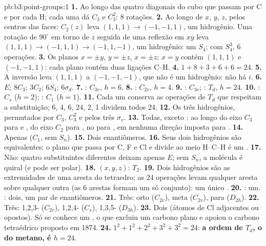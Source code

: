 \begin{solution}{pb:b3:point-groups:1}
\textbf{1.} Ao longo das quatro diagonais do cubo que passam por C e por cada H;
cada uma dá $C_3$ e $C_3^2$: 8 rotações.
\textbf{2.} Ao longo de $x$, $y$, $z$, pelos centros das faces: $C_2(z)$ leva $(1,1,1)
\to (-1,-1,1)$, um hidrogênio. Uma rotação de $90^\circ$ em torno de $z$ seguida
de uma reflexão em $xy$ leva $(1,1,1) \to (-1,1,1) \to (-1,1,-1)$, um hidrogênio: um
$S_4$; com $S_4^3$, 6 operações.
\textbf{3.} Os planos $x = \pm y$, $y = \pm z$, $x = \pm z$; $x = y$ contém
$(1,1,1)$ e $(-1,-1,1)$: cada plano contém duas ligações C--H.
\textbf{4.} $1 + 8 + 3 + 6 + 6 = 24$.
\textbf{5.} A inversão leva $(1,1,1)$ a $(-1,-1,-1)$, que não é um hidrogênio:
não há $i$.
\textbf{6.} $E$; $8C_3$; $3C_2$; $6S_4$; $6\sigma_d$.
\textbf{7.} : $C_{3v}$, $h = 6$.
\textbf{8.} : $C_{2v}$, $h = 4$.
\textbf{9.} : $C_{3v}$; : $T_d$, $h = 24$.
\textbf{10.} : $C_s$ ($h = 2$); : $C_1$ ($h = 1$).
\textbf{11.} Cada um conserva as operações de $T_d$ que respeitam a
substituição; 6, 4, 6, 24, 2, 1 dividem todos 24.
\textbf{12.} Os três hidrogênios, permutados por $C_3$, $C_3^2$ e pelos três
$\sigma_v$.
\textbf{13.} Todas, exceto : ao longo do eixo $C_3$ para  e ,
do eixo $C_2$ para , no  para , em nenhuma
direção imposta para .
\textbf{14.} Apenas  ($C_1$, sem $S_n$).
\textbf{15.} Dois enantiômeros.
\textbf{16.} Seus dois hidrogênios são equivalentes: o plano que passa por C, F
e Cl e divide ao meio H--C--H é um .
\textbf{17.} Não: quatro substituintes diferentes deixam apenas $E$; sem $S_n$, a
molécula é quiral (e pode ser polar).
\textbf{18.} $(x, y, z)$: $T_2$.
\textbf{19.} Dois hidrogênios são as extremidades de uma aresta do tetraedro; as 24
operações levam qualquer aresta sobre qualquer outra (as 6 arestas formam um
só conjunto): um único .
\textbf{20.} : um. : dois, um par de enantiômeros.
\textbf{21.} Três: orto ($C_{2v}$), meta ($C_{2v}$), para ($D_{2h}$).
\textbf{22.} Três: 1,2,3- ($C_{2v}$), 1,2,4- ($C_s$), 1,3,5- ($D_{3h}$).
\textbf{23.} Dois (átomos de Cl adjacentes ou opostos). Só se conhece um
, o que excluiu um carbono plano e apoiou o carbono tetraédrico
proposto em 1874.
\textbf{24.} $1^2 + 1^2 + 2^2 + 3^2 + 3^2 = 24$: \textbf{a ordem de $T_d$, o
 do metano, é $h = 24$}.
\end{solution}
